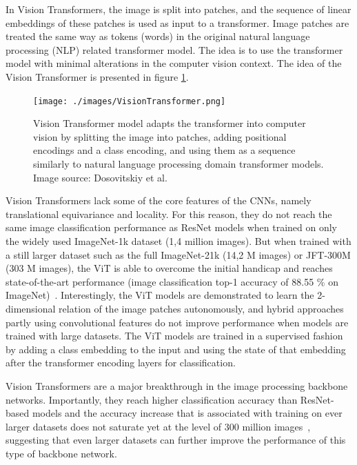 \documentclass[english,twoside,openright]{HYgraduMLDS}
\begin{document}
In Vision Transformers, the image is split into patches, and the sequence of linear embeddings of these patches is used as input to a transformer. Image patches are treated the same way as tokens (words) in the original natural language processing (NLP) related transformer model. The idea is to use the transformer model with minimal alterations in the computer vision context. The idea of the Vision Transformer is presented in figure \ref{fig:Vision_transformer}.

\begin{figure}[h] 
\centering
\texttt{[image: ./images/VisionTransformer.png]}
\caption{Vision Transformer model adapts the transformer into computer vision by splitting the image into patches, adding positional encodings and a class encoding, and using them as a sequence similarly to natural language processing domain transformer models. Image source: Dosovitskiy et al.~\cite{VisionTransformers}}
\label{fig:Vision_transformer} 
\end{figure}

Vision Transformers lack some of the core features of the CNNs, namely translational equivariance and locality. For this reason, they do not reach the same image classification performance as ResNet models when trained on only the widely used ImageNet-1k dataset (1,4 million images). But when trained with a still larger dataset such as the full ImageNet-21k (14,2 M images) or JFT-300M (303 M images), the ViT is able to overcome the initial handicap and reaches state-of-the-art performance (image classification top-1 accuracy of 88.55 \% on ImageNet)~\cite{VisionTransformers}. Interestingly, the ViT models are demonstrated to learn the 2-dimensional relation of the image patches autonomously, and hybrid approaches partly using convolutional features do not improve performance when models are trained with large datasets. The ViT models are trained in a supervised fashion by adding a class embedding to the input and using the state of that embedding after the transformer encoding layers for classification.

Vision Transformers are a major breakthrough in the image processing backbone networks. Importantly, they reach higher classification accuracy than ResNet-based models and the accuracy increase that is associated with training on ever larger datasets does not saturate yet at the level of 300 million images~\cite{VisionTransformers}, suggesting that even larger datasets can further improve the performance of this type of backbone network.
\end{document}

